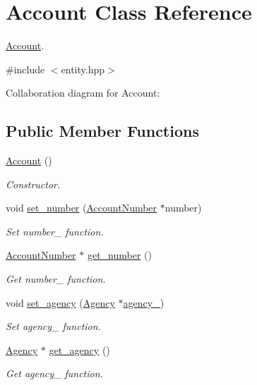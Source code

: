 \hypertarget{classAccount}{}\section{Account Class Reference}
\label{classAccount}


\hyperlink{classAccount}{Account}.  




{\ttfamily \#include $<$entity.\+hpp$>$}



Collaboration diagram for Account\+:
\subsection*{Public Member Functions}
\begin{DoxyCompactItemize}
\item 
\hyperlink{classAccount_a366660970b5eeb5c17436062327f1b14}{Account} ()
\begin{DoxyCompactList}\small\item\em Constructor. \end{DoxyCompactList}\item 
void \hyperlink{classAccount_a72cb398a6b59220b3b9a72cfbbb29ce6}{set\+\_\+number} (\hyperlink{classAccountNumber}{Account\+Number} $\ast$number)
\begin{DoxyCompactList}\small\item\em Set number\+\_\+ function. \end{DoxyCompactList}\item 
\hyperlink{classAccountNumber}{Account\+Number} $\ast$ \hyperlink{classAccount_a1c2476097e7b46beeffd32d3dfcd2623}{get\+\_\+number} ()
\begin{DoxyCompactList}\small\item\em Get number\+\_\+ function. \end{DoxyCompactList}\item 
void \hyperlink{classAccount_a85136c1137c142d0df5fa6101b5ba9e3}{set\+\_\+agency} (\hyperlink{classAgency}{Agency} $\ast$\hyperlink{classAccount_aae91c040a72090dc87375ea59f9f3c38}{agency\+\_\+})
\begin{DoxyCompactList}\small\item\em Set agency\+\_\+ function. \end{DoxyCompactList}\item 
\hyperlink{classAgency}{Agency} $\ast$ \hyperlink{classAccount_a4af4410531bc95c63d19a7440f752d5d}{get\+\_\+agency} ()
\begin{DoxyCompactList}\small\item\em Get agency\+\_\+ function. \end{DoxyCompactList}\item 

\end{DoxyCompactItemize}
